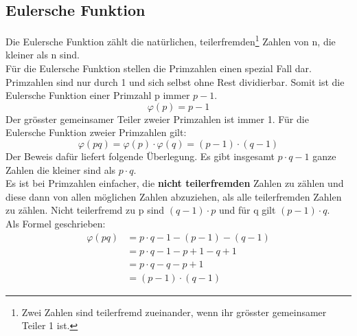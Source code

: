 \subsection{Eulersche Funktion}

Die Eulersche Funktion zählt die natürlichen, teilerfremden\footnote{Zwei Zahlen sind teilerfremd zueinander, wenn ihr grösster gemeinsamer Teiler 1 ist.}  Zahlen von n, die kleiner als n sind.\\
Für die Eulersche Funktion stellen die Primzahlen einen spezial Fall dar.
Primzahlen sind nur durch 1 und sich selbst ohne Rest dividierbar. Somit ist die Eulersche Funktion einer Primzahl p immer $p - 1$. 
%
\begin{equation*}
  \varphi(p) = p - 1
\end{equation*}
%
Der grösster gemeinsamer Teiler zweier Primzahlen ist immer 1.
Für die Eulersche Funktion zweier Primzahlen gilt:
\begin{equation}
  \varphi(pq) = \varphi(p) \cdot \varphi(q) = (p - 1) \cdot (q - 1)
  \label{eqn:eulersche_func}
\end{equation}
Der Beweis dafür liefert folgende Überlegung. Es gibt insgesamt $p \cdot q -1$ ganze Zahlen die kleiner sind als $p \cdot q$.\\
Es ist bei Primzahlen einfacher, die \textbf{nicht teilerfremden} Zahlen zu zählen und diese dann von allen möglichen Zahlen abzuziehen, als alle teilerfremden Zahlen zu zählen. Nicht teilerfremd zu p sind $(q - 1) \cdot p$ und für q gilt $ (p - 1) \cdot q$.\\
Als Formel geschrieben:
%
\begin{equation*}
  \begin{split}
    \varphi(pq) & = p \cdot q -1 - (p - 1) - (q - 1)  \\
     & = p \cdot q -1 - p + 1 - q + 1  \\
     & = p \cdot q -q - p + 1  \\
     & = (p -1) \cdot (q - 1)
    \label{eqn:herleitung_eulersche_func}
  \end{split}
\end{equation*}
%
